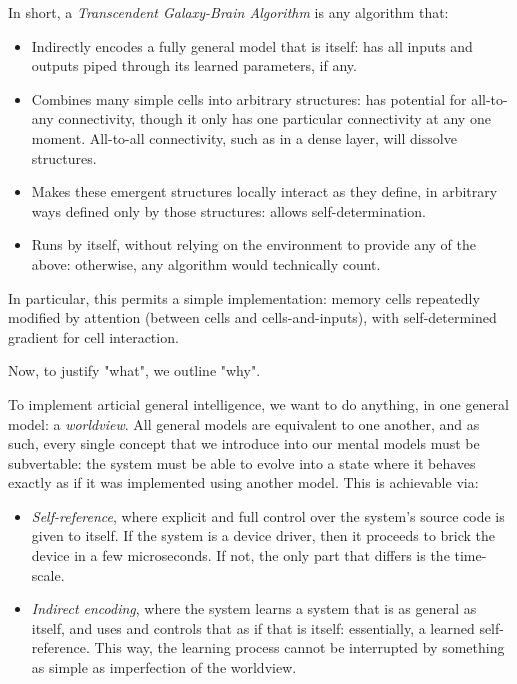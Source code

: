 \documentclass{article}
\begin{document}
In short, a \textit{Transcendent Galaxy-Brain Algorithm} is any algorithm that:

\begin{itemize}
\item Indirectly encodes a fully general model that is itself: has all inputs and outputs piped through its learned parameters, if any.
\item Combines many simple cells into arbitrary structures: has potential for all-to-any connectivity, though it only has one particular connectivity at any one moment. All-to-all connectivity, such as in a dense layer, will dissolve structures.
\item Makes these emergent structures locally interact as they define, in arbitrary ways defined only by those structures: allows self-determination.
\item Runs by itself, without relying on the environment to provide any of the above: otherwise, any algorithm would technically count.
\end{itemize}

In particular, this permits a simple implementation: memory cells repeatedly modified by attention (between cells and cells-and-inputs), with self-determined gradient for cell interaction.

Now, to justify "what", we outline "why".

To implement articial general intelligence, we want to do anything, in one general model: a \textit{worldview}. All general models are equivalent to one another, and as such, every single concept that we introduce into our mental models must be subvertable: the system must be able to evolve into a state where it behaves exactly as if it was implemented using another model. This is achievable via:

\begin{itemize}
\item \textit{Self-reference}, where explicit and full control over the system's source code is given to itself. If the system is a device driver, then it proceeds to brick the device in a few microseconds. If not, the only part that differs is the time-scale.
\item \textit{Indirect encoding}, where the system learns a system that is as general as itself, and uses and controls that as if that is itself: essentially, a learned self-reference. This way, the learning process cannot be interrupted by something as simple as imperfection of the worldview.
\end{itemize}
\end{document}
